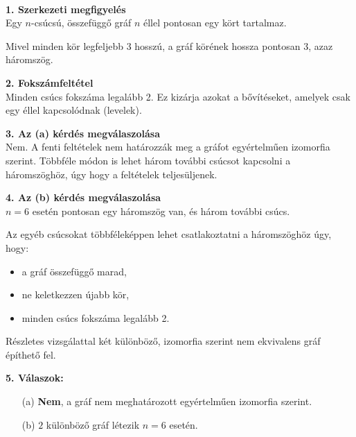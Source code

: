 \begin{solution}
~

\textbf{1. Szerkezeti megfigyelés}\\
Egy $n$-csúcsú, összefüggő gráf $n$ éllel pontosan egy kört tartalmaz.

Mivel minden kör legfeljebb 3 hosszú, a gráf körének hossza pontosan
3, azaz háromszög.

\textbf{2. Fokszámfeltétel}\\
Minden csúcs fokszáma legalább 2. Ez kizárja azokat a bővítéseket,
amelyek csak egy éllel kapcsolódnak (levelek).

\textbf{3. Az (a) kérdés megválaszolása}\\
Nem. A fenti feltételek nem határozzák meg a gráfot egyértelműen izomorfia
szerint. Többféle módon is lehet három további csúcsot kapcsolni a
háromszöghöz, úgy hogy a feltételek teljesüljenek.

\textbf{4. Az (b) kérdés megválaszolása}\\
$n=6$ esetén pontosan egy háromszög van, és három további csúcs.

Az egyéb csúcsokat többféleképpen lehet csatlakoztatni a háromszöghöz
úgy, hogy: 
\begin{itemize}
\item a gráf összefüggő marad, 
\item ne keletkezzen újabb kör, 
\item minden csúcs fokszáma legalább 2. 
\end{itemize}
Részletes vizsgálattal két különböző, izomorfia szerint nem ekvivalens
gráf építhető fel.

\textbf{5. Válaszok:}
\begin{itemize}
\item[(a)] \textbf{Nem}, a gráf nem meghatározott egyértelműen izomorfia szerint. 
\item[(b)] $\boxed{2}$ különböző gráf létezik $n=6$ esetén. 
\end{itemize}
\end{solution}


